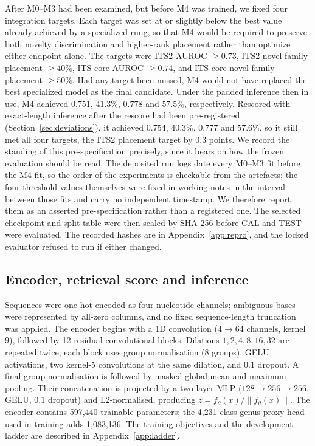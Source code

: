 \documentclass[11pt]{article}
\begin{document}
After M0--M3 had been examined, but before M4 was trained, we fixed four
integration targets. Each target was
set at or slightly below the best value already achieved by a specialized rung,
so that M4 would be required to preserve both novelty discrimination and
higher-rank placement rather than optimize either endpoint alone. The targets
were ITS2 AUROC $\geq0.73$, ITS2 novel-family placement $\geq40\%$, ITS-core
AUROC $\geq0.74$, and ITS-core novel-family placement $\geq50\%$. Had any
target been missed, M4 would not have replaced the best specialized model as
the final candidate. Under the padded inference then in use, M4 achieved
$0.751$, $41.3\%$, $0.778$ and $57.5\%$, respectively. Rescored with exact-length
inference after the rescore had been pre-registered (Section~\ref{sec:deviations}),
it achieved $0.754$, $40.3\%$, $0.777$ and $57.6\%$, so it still met all four
targets, the ITS2 placement target by $0.3$ points. We record the standing of this pre-specification precisely, since
it bears on how the frozen evaluation should be read. The deposited run logs
date every M0--M3 fit before the M4 fit, so the order of the experiments is
checkable from the artefacts; the four threshold values themselves were fixed in
working notes in the interval between those fits and carry no independent
timestamp. We therefore report them as an asserted pre-specification rather than
a registered one. The selected checkpoint and split table were then sealed by
SHA-256 before CAL and TEST were evaluated. The recorded hashes are in
Appendix~\ref{app:repro}, and the locked evaluator refused to run if either
changed.

\subsection{Encoder, retrieval score and inference}
\label{sec:encoder}
Sequences were one-hot encoded as four nucleotide channels; ambiguous bases were
represented by all-zero columns, and no fixed sequence-length truncation was
applied. The encoder begins with a 1D convolution ($4\rightarrow64$ channels,
kernel 9), followed by 12 residual convolutional blocks. Dilations
$1,2,4,8,16,32$ are repeated twice; each block uses group normalisation (8
groups), GELU activations, two kernel-5 convolutions at the same dilation, and
$0.1$ dropout. A final group normalisation is followed by masked global mean and
maximum pooling. Their concatenation is projected by a two-layer MLP
($128\rightarrow256\rightarrow256$, GELU, $0.1$ dropout) and L2-normalised,
producing $z=f_\theta(x)/\lVert f_\theta(x)\rVert$. The encoder contains
597,440 trainable parameters; the 4,231-class genus-proxy head used in training
adds 1,083,136. The training objectives and the development ladder are
described in Appendix~\ref{app:ladder}.
\end{document}
